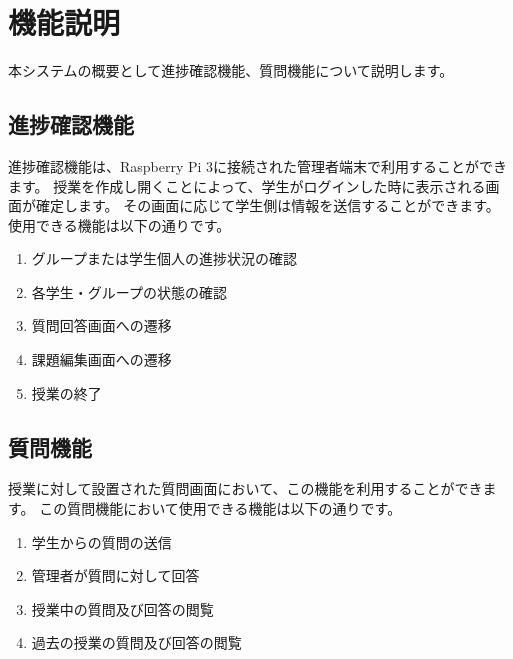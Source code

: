 \section{機能説明}
本システムの概要として進捗確認機能、質問機能について説明します。
\subsection{進捗確認機能}
進捗確認機能は、Raspberry Pi 3に接続された管理者端末で利用することができます。
授業を作成し開くことによって、学生がログインした時に表示される画面が確定します。
その画面に応じて学生側は情報を送信することができます。
使用できる機能は以下の通りです。
\begin{enumerate}
  \item グループまたは学生個人の進捗状況の確認
  \item 各学生・グループの状態の確認%
  \item 質問回答画面への遷移
  \item 課題編集画面への遷移
  \item 授業の終了
\end{enumerate}

\subsection{質問機能}
授業に対して設置された質問画面において、この機能を利用することができます。
この質問機能において使用できる機能は以下の通りです。
\begin{enumerate}
  \item 学生からの質問の送信
  \item 管理者が質問に対して回答
  \item 授業中の質問及び回答の閲覧
  \item 過去の授業の質問及び回答の閲覧
\end{enumerate}
